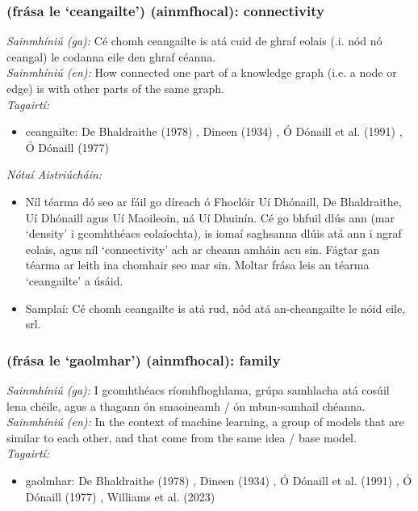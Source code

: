 \subsubsection*{(frása le `ceangailte') (ainmfhocal): connectivity}
 \noindent \textit{Sainmhíniú (ga):} Cé chomh ceangailte is atá cuid de ghraf eolais (.i. nód nó ceangal) le codanna eile den ghraf céanna.
\\
 \noindent \textit{Sainmhíniú (en):} How connected one part of a knowledge graph (i.e. a node or edge) is with other parts of the same graph.
\\
 \noindent \textit{Tagairtí:}
\begin{itemize}
	\item ceangailte: De Bhaldraithe (1978) \cite{de-bhaldraithe}, Dineen (1934) \cite{dineen}, Ó Dónaill et al. (1991) \cite{focloir-beag}, Ó Dónaill (1977) \cite{odonaill}
\end{itemize}

 \noindent \textit{Nótaí Aistriúcháin:}
\begin{itemize}
	\item Níl téarma dó seo ar fáil go díreach ó Fhoclóir Uí Dhónaill, De Bhaldraithe, Uí Dhónaill agus Uí Maoileoin, ná Uí Dhuinín. Cé go bhfuil dlús ann (mar `density' i gcomhthéacs eolaíochta), is iomaí saghsanna dlúis atá ann i ngraf eolais, agus níl `connectivity' ach ar cheann amháin acu sin. Fágtar gan téarma ar leith ina chomhair seo mar sin. Moltar frása leis an téarma `ceangailte' a úsáid.
	\item Samplaí: Cé chomh ceangailte is atá rud, nód atá an-cheangailte le nóid eile, srl.
\end{itemize}


\subsubsection*{(frása le `gaolmhar') (ainmfhocal): family}
 \noindent \textit{Sainmhíniú (ga):} I gcomhthéacs ríomhfhoghlama, grúpa samhlacha atá cosúil lena chéile, agus a thagann ón smaoineamh / ón mbun-samhail chéanna.
\\
 \noindent \textit{Sainmhíniú (en):} In the context of machine learning, a group of models that are similar to each other, and that come from the same idea / base model.
\\
 \noindent \textit{Tagairtí:}
\begin{itemize}
	\item gaolmhar: De Bhaldraithe (1978) \cite{de-bhaldraithe}, Dineen (1934) \cite{dineen}, Ó Dónaill et al. (1991) \cite{focloir-beag}, Ó Dónaill (1977) \cite{odonaill}, Williams et al. (2023) \cite{storchiste}
\end{itemize}

